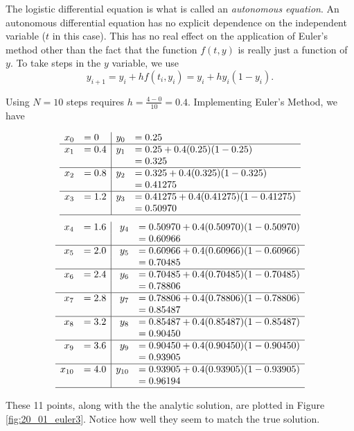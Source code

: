 {The logistic differential equation is what is called an \emph{autonomous equation}.  An autonomous differential equation  has no explicit dependence on the independent variable ($t$ in this case).  This has no real effect on the application of Euler's method other than the fact that the function $f(t,y)$ is really just a function of $y$.  To take steps in the $y$ variable, we use
\[y_{i+1} = y_i + hf(t_i,y_i) = y_i + hy_i(1-y_i).\]

Using $N=10$ steps requires $\displaystyle h = \frac{4-0}{10} = 0.4.$  Implementing Euler's Method, we have

\[
\begin{array}{rl | rl}
x_0  &= 0			& 	y_0	&= 0.25\\ \hline
x_1 	&= 0.4		&	y_1 	&= 0.25 + 0.4(0.25)(1-0.25)\\
	&			&		&= 0.325\\ \hline
x_2 	&= 0.8 		& 	y_2 	&= 0.325 + 0.4(0.325)(1-0.325)\\
	&			&		&= 0.41275\\ \hline
x_3	&= 1.2		&	y_3 	&= 0.41275 + 0.4(0.41275)(1-0.41275)\\
	&			&		&= 0.50970\\ \hline
\end{array}
\]
\[
\begin{array}{rl | rl}
x_4	&= 1.6		&	y_4	&= 0.50970 + 0.4(0.50970)(1 - 0.50970)\\
	&			&		&= 0.60966\\ \hline
x_5  &= 2.0		& 	y_5	&= 0.60966 + 0.4(0.60966)(1-0.60966)\\
	&			&		&=  0.70485\\ \hline
x_6 	&= 2.4		&	y_6 	&= 0.70485 + 0.4(0.70485)(1 - 0.70485)\\
	&			&		&= 0.78806\\ \hline
x_7 	&= 2.8 		& 	y_7 	&= 0.78806 + 0.4(0.78806)(1-0.78806)\\
	&			&		&= 0.85487\\ \hline
x_8	&= 3.2		&	y_8 	&= 0.85487 + 0.4(0.85487)(1-0.85487)\\
	&			&		&= 0.90450\\ \hline
x_9	&= 3.6		&	y_9	&= 0.90450 + 0.4(0.90450)(1 - 0.90450)\\
	&			&		&= 0.93905\\ \hline
x_{10}&= 4.0		&	y_{10}&= 0.93905 + 0.4(0.93905)(1 - 0.93905)\\
	&			&		&= 0.96194\\ \hline
\end{array}
\]

These 11 points, along with the  the analytic solution, are plotted in Figure \ref{fig:20_01_euler3}. Notice how well they seem to match the true solution.
}\\

